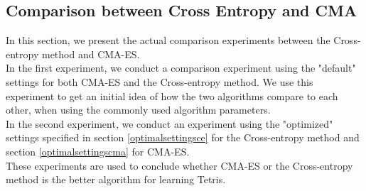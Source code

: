 \subsection{Comparison between Cross Entropy and CMA}

In this section, we present the actual comparison experiments between the Cross-entropy method
and CMA-ES.\\
In the first experiment, we conduct a comparison experiment using the 
"default" settings for both CMA-ES and the Cross-entropy method. We use this experiment to
get an initial idea of how the two algorithms compare to each other, when using the commonly
used algorithm parameters.\\
In the second experiment, we conduct an experiment using the "optimized" settings
specified in section \ref{optimalsettingsce} for the Cross-entropy method and section
\ref{optimalsettingscma} for CMA-ES.\\
These experiments are used to conclude whether CMA-ES or the Cross-entropy method
is the better algorithm for learning Tetris.






